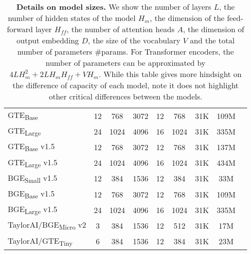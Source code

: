 \begin{table*}[ht!]
\begin{tabular}{lcccccccc}
      GTE\textsubscript{Base} & 12 & 768 & 3072 & 12 & 768 & 31K & 109M \\
      GTE\textsubscript{Large} & 24 & 1024 & 4096 & 16 & 1024 & 31K & 335M \\
      GTE\textsubscript{Base} v1.5 & 12 & 768 & 3072 & 12 & 768 & 31K & 137M \\
      GTE\textsubscript{Large} v1.5 & 24 & 1024 & 4096 & 16 & 1024 & 31K & 434M \\
      BGE\textsubscript{Small} v1.5 & 12 & 384 & 1536 & 12 & 384 & 31K & 33M \\
      BGE\textsubscript{Base} v1.5 & 12 & 768 & 3072 & 12 & 768 & 31K & 109M \\
      BGE\textsubscript{Large} v1.5 & 24 & 1024 & 4096 & 16 & 1024 & 31K & 335M \\
      TaylorAI/BGE\textsubscript{Micro} v2 & 3 & 384 & 1536 & 12 & 512 & 31K & 17M \\
      TaylorAI/GTE\textsubscript{Tiny} & 6 & 384 & 1536 & 12 & 384 & 31K & 23M \\
      
      \bottomrule
    \end{tabular}
    \caption{\textbf{Details on model sizes.}
            We show the number of layers $L$, the number of hidden states of the model $H_{m}$, the dimension of the feed-forward layer $H_{ff}$, the number of attention heads $A$, the dimension of output embedding $D$, the size of the vocabulary $V$ and the total number of parameters \#params. 
            For Transformer encoders, the number of parameters can be approximated by $4LH_m^2 + 2LH_m H_{ff} + VH_m$.
            While this table gives more hindsight on the difference of capacity of each model, note it does not highlight other critical differences between the models.}
    \label{tab:parameters}
  \end{table*}
  